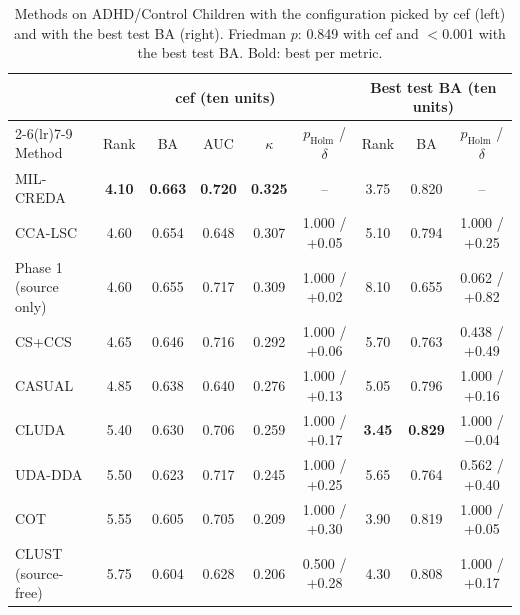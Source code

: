 \begin{table}[!t]
\centering
\footnotesize
\caption{Methods on ADHD/Control Children with the configuration picked by cef (left) and with the best test BA (right). Friedman $p$: 0.849 with cef and $<$0.001 with the best test BA. Bold: best per metric.}
\label{tab:ieee-ranking}
\begin{tabular*}{\linewidth}{@{\extracolsep{\fill}}lcccccccc}
\toprule
 & \multicolumn{5}{c}{cef (ten units)} & \multicolumn{3}{c}{Best test BA (ten units)} \\
\cmidrule(lr){2-6}\cmidrule(lr){7-9}
Method & Rank & BA & AUC & $\kappa$ & $p_{\mathrm{Holm}}$ / $\delta$ & Rank & BA & $p_{\mathrm{Holm}}$ / $\delta$ \\
\midrule
MIL-CREDA & \textbf{4.10} & \textbf{0.663} & \textbf{0.720} & \textbf{0.325} & -- & 3.75 & 0.820 & -- \\
CCA-LSC & 4.60 & 0.654 & 0.648 & 0.307 & 1.000 / +0.05 & 5.10 & 0.794 & 1.000 / +0.25 \\
Phase 1 (source only) & 4.60 & 0.655 & 0.717 & 0.309 & 1.000 / +0.02 & 8.10 & 0.655 & 0.062 / +0.82 \\
CS+CCS & 4.65 & 0.646 & 0.716 & 0.292 & 1.000 / +0.06 & 5.70 & 0.763 & 0.438 / +0.49 \\
CASUAL & 4.85 & 0.638 & 0.640 & 0.276 & 1.000 / +0.13 & 5.05 & 0.796 & 1.000 / +0.16 \\
CLUDA & 5.40 & 0.630 & 0.706 & 0.259 & 1.000 / +0.17 & \textbf{3.45} & \textbf{0.829} & 1.000 / $-$0.04 \\
UDA-DDA & 5.50 & 0.623 & 0.717 & 0.245 & 1.000 / +0.25 & 5.65 & 0.764 & 0.562 / +0.40 \\
COT & 5.55 & 0.605 & 0.705 & 0.209 & 1.000 / +0.30 & 3.90 & 0.819 & 1.000 / +0.05 \\
CLUST (source-free) & 5.75 & 0.604 & 0.628 & 0.206 & 0.500 / +0.28 & 4.30 & 0.808 & 1.000 / +0.17 \\
\bottomrule
\end{tabular*}
\end{table}
